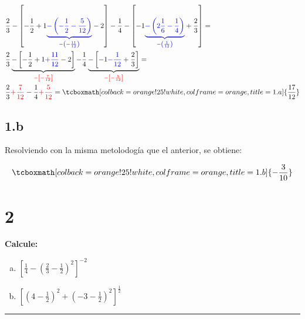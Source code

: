 \documentclass{article}
\begin{document}
\begin{subequations}
\begin{align}
&\frac{2}{3} - \left[ -\frac{1}{2} + 1 \textcolor{blue}{ \underbrace{ - \left( -\frac{1}{2} - \frac{5}{12} \right)}_{-\left(    -\frac{11}{12} \right)}} - 2  \right] -\frac{1}{4} - \left[ -1 \textcolor{blue}{ \underbrace{ -\left(2 \frac{1}{6} - \frac{1}{4} \right) }_{-\left( \frac{1}{12} \right)}} +\frac{2}{3} \right] = \\
&\frac{2}{3} \underbrace{ - \left[ -\frac{1}{2} + 1 \textcolor{blue}{ + \frac{11}{12} } - 2  \right] }_{\textcolor{red}{-\left[ -\frac{7}{12} \right]}} -\frac{1}{4} \underbrace{-\left[ -1 \textcolor{blue}{ -\frac{1}{12} } +\frac{2}{3} \right]}_{\textcolor{red}{-\left[ -\frac{5}{12} \right]}} = \\ 
&\frac{2}{3} \textcolor{red}{ +\frac{7}{12} } -\frac{1}{4} \textcolor{red}{ +\frac{5}{12} } = \tcboxmath[colback=orange!25!white,colframe=orange, title=1.a] { \frac{17}{12} }
\end{align}
\end{subequations}

\subsection*{1.b}
\label{subsec:1.b}

Resolviendo con la misma metolodogía que el anterior, se obtiene:

\begin{equation}
\tcboxmath[colback=orange!25!white,colframe=orange, title=1.b] { -\frac{3}{10} }
\end{equation}

\section*{2}
\label{sec:2}

\textbf{Calcule:}

\begin{enumerate}[(a)]
\bfseries

\item $\left[ \frac{1}{4} - \left( \frac{2}{3} - \frac{1}{2} \right)^2 \right]^{-2}$

\item $\left[ \left( 4 - \frac{1}{2} \right)^2 + \left( -3-\frac{1}{2} \right)^2 \right]^{\frac{1}{2}}$

\end{enumerate}
\hrule
\end{document}
